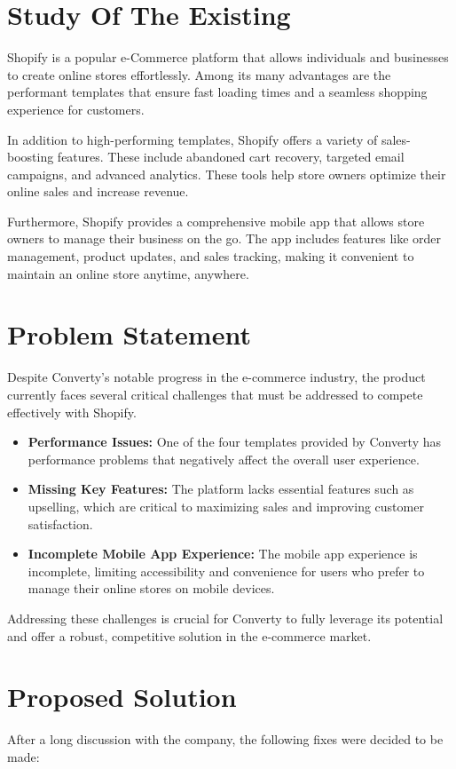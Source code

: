 \section{Study Of The Existing}
Shopify is a popular e-Commerce platform that allows individuals and businesses to create online stores effortlessly. Among its many advantages are the performant templates that ensure fast loading times and a seamless shopping experience for customers.
\newline

In addition to high-performing templates, Shopify offers a variety of sales-boosting features. These include abandoned cart recovery, targeted email campaigns, and advanced analytics. These tools help store owners optimize their online sales and increase revenue.
\newline

Furthermore, Shopify provides a comprehensive mobile app that allows store owners to manage their business on the go. The app includes features like order management, product updates, and sales tracking, making it convenient to maintain an online store anytime, anywhere.

\section{Problem Statement} 
Despite Converty's notable progress in the e-commerce industry, the product currently faces several critical challenges that must be addressed to compete effectively with Shopify. 
\begin{itemize} 
    \item \textbf{Performance Issues:} One of the four templates provided by Converty has performance problems that negatively affect the overall user experience. 
    \item \textbf{Missing Key Features:} The platform lacks essential features such as upselling, which are critical to maximizing sales and improving customer satisfaction. 
    \item \textbf{Incomplete Mobile App Experience:} The mobile app experience is incomplete, limiting accessibility and convenience for users who prefer to manage their online stores on mobile devices. 
\end{itemize} 
Addressing these challenges is crucial for Converty to fully leverage its potential and offer a robust, competitive solution in the e-commerce market.

\section{Proposed Solution}
After a long discussion with the company, the following fixes were decided to be made:

